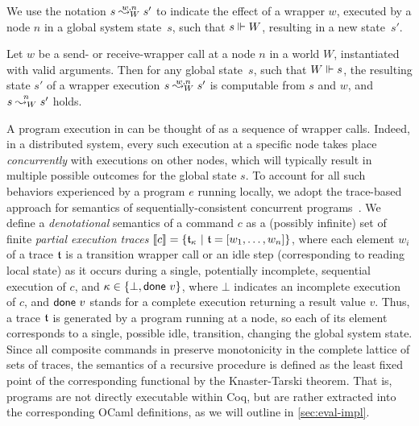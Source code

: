We use the notation $\nsemw{W}{n}{s}{s'}$ to indicate the effect of a
wrapper $w$, executed by a node $n$ in a global system state~$s$, such
that $\Coh{s}{W}$, resulting in a new state~$s'$.

\begin{lemma}
\label{lm:wrap}
Let $w$ be a send- or receive-wrapper call at a node $n$ in a world
$W$, instantiated with valid arguments. Then for any global state~$s$,
such that $\Coh{W}{s}$, the resulting state $s'$ of a wrapper
execution $\nsemw{W}{n}{s}{s'}$ is computable from $s$ and $w$, and
$\nsem{W}{n}{s}{s'}$ holds.
\end{lemma}

%
A program execution in \disel can be thought of as a sequence of
wrapper calls.
%
Indeed, in a distributed system, every such execution at a specific
node takes place \emph{concurrently} with executions on other nodes,
which will typically result in multiple possible outcomes for the
global state $s$.
%
To account for all such behaviors experienced by a program $e$ running
locally, we adopt the trace-based approach for semantics of
sequentially-consistent concurrent programs~\cite{Brookes:TCS07}. We
define a \emph{denotational} semantics of a \disel command $c$ as a
(possibly infinite) set of finite \emph{partial execution traces}
$\denote{c} = \set{\trace_{\stat}~|~\trace = [w_1, \ldots, w_n]}$,
where each element $w_i$ of a trace $\trace$ is a transition wrapper
call or an idle step (corresponding to reading local state) as it
occurs during a single, potentially incomplete, sequential execution
of $c$, and $\stat \in \set{\bot, \done~v}$, where $\bot$ indicates an
incomplete execution of $c$, and $\done~v$ stands for a complete
execution returning a result value $v$.
%
%
Thus, a trace $\trace$ is generated by a program running at a node, so
each of its element corresponds to a single, possible idle,
transition, changing the global system state.
%
Since all composite commands in \disel preserve monotonicity in the
complete lattice of sets of traces, the semantics of a recursive
procedure is defined as the least fixed point of the corresponding
functional by the Knaster-Tarski theorem. That is, \disel programs are
not directly executable within Coq, but are rather extracted into the
corresponding OCaml definitions, as we will outline in
\cref{sec:eval-impl}.



